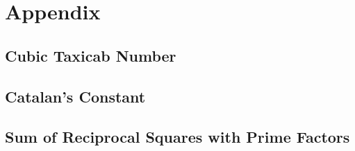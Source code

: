 \section{Appendix}

\subsection{Cubic Taxicab Number}

\subsection{Catalan's Constant}

\subsection{Sum of Reciprocal Squares with Prime Factors}